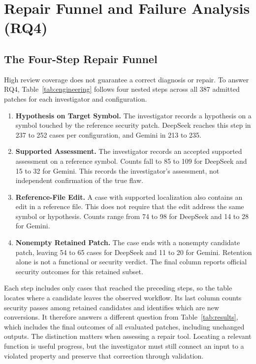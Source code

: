 \section{Repair Funnel and Failure Analysis (RQ4)}
\label{sec:engineering}
\subsection{The Four-Step Repair Funnel}
High review coverage does not guarantee a correct diagnosis or repair. To answer RQ4, Table~\ref{tab:engineering} follows four nested steps across all 387 admitted patches for each investigator and configuration.

\begin{table}[t]
\caption{Four-step investigation and repair funnel across 387 admitted patches per configuration. SecPass and new fixes count only candidates within Step 4. Bold highlights supported assessments and C2's new fixes.}
\label{tab:engineering}
\centering\footnotesize

\end{table}

\begin{enumerate}
\item \textbf{Hypothesis on Target Symbol.} The investigator records a hypothesis on a symbol touched by the reference security patch. DeepSeek reaches this step in 237 to 252 cases per configuration, and Gemini in 213 to 235.
\item \textbf{Supported Assessment.} The investigator records an accepted supported assessment on a reference symbol. Counts fall to 85 to 109 for DeepSeek and 15 to 32 for Gemini. This records the investigator's assessment, not independent confirmation of the true flaw.
\item \textbf{Reference-File Edit.} A case with supported localization also contains an edit in a reference file. This does not require that the edit address the same symbol or hypothesis. Counts range from 74 to 98 for DeepSeek and 14 to 28 for Gemini.
\item \textbf{Nonempty Retained Patch.} The case ends with a nonempty candidate patch, leaving 54 to 65 cases for DeepSeek and 11 to 20 for Gemini. Retention alone is not a functional or security verdict. The final column reports official security outcomes for this retained subset.
\end{enumerate}

Each step includes only cases that reached the preceding steps, so the table locates where a candidate leaves the observed workflow. Its last column counts security passes among retained candidates and identifies which are new conversions. It therefore answers a different question from Table~\ref{tab:results}, which includes the final outcomes of all evaluated patches, including unchanged outputs.
The distinction matters when assessing a repair tool. Locating a relevant function is useful progress, but the investigator must still connect an input to a violated property and preserve that correction through validation.


